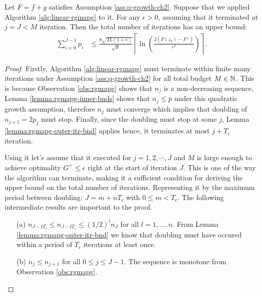 \documentclass[12pt]{report}
\begin{document}
        \begin{theorem}
            Let $F = f + g$ satisfies Assumption \ref{ass:q-growth-ch2}. 
            Suppose that we applied Algorithm \ref{alg:linear-rgmapg} to it. 
            For any $\epsilon > 0$, assuming that it terminated at $j = J < M$ iteration.
            Then the total number of iterations has an upper bound:
            \begin{align*}
                \sum_{i = 0}^{J - 1}p_i &\le 
                \frac{8\sqrt{2L(1 + e)}}{\sqrt{\mu}} \left\lceil 
                \ln \left(
                    \frac{2(F(z_0) - F^+)}{\epsilon^2}
                \right) 
                \right\rceil. 
            \end{align*}
        \end{theorem}
        \begin{proof}
            Firstly, Algorithm \ref{alg:linear-rgmapg} must terminate within finite many iterations under Assumption \ref{ass:q-growth-ch2} for all total budget $M \in \mathbb N$. 
            This is because Observation \ref{obs:rgmapg} shows that $n_j$ is a non-decreasing sequence, Lemma \ref{lemma:rgmapg-inner-bnds} shows that $n_j \le \bar p$ under this quadratic growth assumption, therefore $n_j$ must converge which implies that doubling of $n_{j + 1} = 2p_{j}$ must stop. 
            Finally, since the doubling must stop at some $j$, Lemma \ref{lemma:rgmapg-outer-itr-bnd} applies hence, it terminates at most $j + T_\epsilon$ iteration. 
            \par
            Using it let's assume that it executed for $j = 1, 2, \cdots, J$ and $M$ is large enough to achieve optimality $G^+ \le \epsilon$ right at the start of iteration $J$.
            This is one of the way the algorithm can terminate, making it a sufficient condition for deriving the upper bound on the total number of iterations. 
            Representing it by the maximum period between doubling: $J = m + nT_\epsilon$ with $0 \le m < T_\epsilon$. 
            The following intermediate results are important to the proof. 
            \begin{enumerate}
                \item [(a)] $n_{J - lT_\epsilon} \le n_{J - lT_\epsilon}\le (1/2)^ln_J$ for all $l = 1, \ldots, n$. From Lemma \ref{lemma:rgmapg-outer-itr-bnd} we know that doubling must have occured within a period of $T_\epsilon$ iterations at least once.
                \item [(b)] $n_{j} \le n_{j + 1}$ for all $0 \le j \le J - 1$. The sequence is monotone from Observation \ref{obs:rgmapg}. 

\end{enumerate}
\end{proof}
\end{document}
